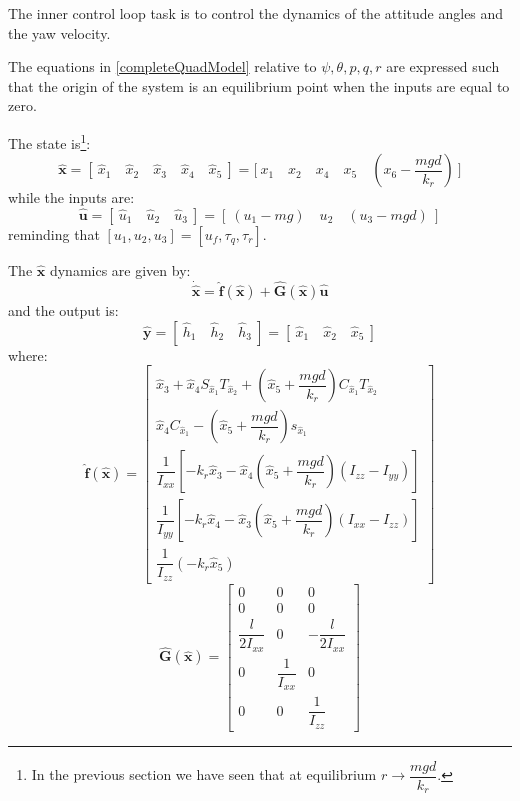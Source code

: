 \documentclass[11pt,a4paper]{scrartcl}
\begin{document}
The inner control loop task is to control the dynamics of the attitude angles and the yaw velocity.

The equations in \eqref{completeQuadModel} relative to $ \psi, \theta, p, q, r $ are expressed such that the origin of the system is an equilibrium point when the inputs are equal to zero.

The state is\footnote{In the previous section we have seen that at equilibrium $ r \rightarrow \dfrac{mgd}{k_r} $. }:
\begin{equation}
	\mathbf{\hat{x}} = [ \ \hat{x}_1 \quad \hat{x}_2 \quad \hat{x}_3 \quad \hat{x}_4 \quad \hat{x}_5 \ ] = \Big[ \  x_1 \quad x_2 \quad x_4 \quad x_5 \quad (x_6-\dfrac{mgd}{k_r}) \ \Big]	
\end{equation}
while the inputs are:
\begin{equation}
	\mathbf{\hat{u}} = [ \ \hat{u}_1 \quad \hat{u}_2 \quad \hat{u}_3 \ ] = [ \ (u_1 -mg) \quad u_2 \quad (u_3 - mgd) \ ]
\end{equation}
reminding that $ [u_1, u_2, u_3] = [u_f, \tau_q, \tau_r ]  $.

The $ \mathbf{\hat{x}} $ dynamics are given by:
\begin{equation}
	\mathbf{\dot{\hat{x}}=\hat{f}(\hat{x})+\hat{G}(\hat{x})\hat{u}}
\end{equation}
and the output is:
\begin{equation}
	\mathbf{\hat{y}}= [ \ \hat{h}_1 \quad \hat{h}_2 \quad \hat{h}_3 \ ] = [ \ \hat{x}_1 \quad \hat{x}_2 \quad \hat{x}_5 \ ]
\end{equation}
where:
\renewcommand{\arraystretch}{1.6}
\begin{equation}
	\mathbf{\hat{f}(\hat{x})}=
	\begin{bmatrix}
	\hat{x}_3 + \hat{x}_4 S_{\hat{x}_1} T_{\hat{x}_2} + (\hat{x}_5 + \dfrac{mgd}{k_r}) C_{\hat{x}_1} T_{\hat{x}_2} \\
	\hat{x}_4 C_{\hat{x}_1} - (\hat{x}_5 + \dfrac{mgd}{k_r}) s_{\hat{x}_1}  \\
	\dfrac{1}{I_{xx}} [-k_r \hat{x}_3 - \hat{x}_4(\hat{x}_5 + \dfrac{mgd}{k_r}) (I_{zz} - I_{yy}) ] \\
	\dfrac{1}{I_{yy}} [-k_r \hat{x}_4 - \hat{x}_3(\hat{x}_5 + \dfrac{mgd}{k_r}) (I_{xx} - I_{zz})] \\
	\dfrac{1}{I_{zz}} (-k_r \hat{x}_5)
	\end{bmatrix}
\end{equation}
\renewcommand{\arraystretch}{1}
\begin{equation}
	\mathbf{\hat{G}(\hat{x})} =
	\begin{bmatrix}
	0 & 0 & 0 \\
	0 & 0 & 0 \\
	\dfrac{l}{2I_{xx}} & 0 & -\dfrac{l}{2I_{xx}} \\
	0 & \dfrac{1}{I_{xx}} & 0 \\
	0 & 0 & \dfrac{1}{I_{zz}}	
	\end{bmatrix}
\end{equation}
\end{document}
